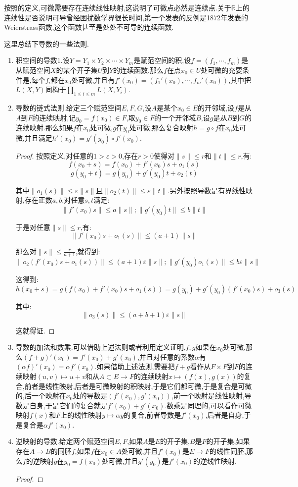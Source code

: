 按照的定义,可微需要存在连续线性映射,这说明了可微点必然是连续点.关于$\mathbb{R}$上的连续性是否说明可导曾经困扰数学界很长时间,第一个发表的反例是1872年发表的Weierstrass函数,这个函数甚至是处处不可导的连续函数.

这里总结下导数的一些法则.
\begin{enumerate}
	\item 积空间的导数1.设$Y=Y_1\times Y_2\times\cdots\times Y_m$是赋范空间的积,设$f=(f_1,\cdots,f_m)$是从赋范空间$X$的某个开子集$U$到$Y$的连续函数.那么$f$在点$x_0\in U$处可微的充要条件是,每个$f_i$都在$x_0$处可微,并且有$f'(x_0)=(f_1'(x_0),\cdots,f_m'(x_0))$,其中把$L(X,Y)$同构于$\prod_{1\le i\le m}L(X,Y_i)$.
	\item 导数的链式法则.给定三个赋范空间$E,F,G$,设$A$是某个$x_0\in E$的开邻域,设$f$是从$A$到$F$的连续映射,记$y_0=f(x_0)\in F$,取$y_0\in F$的一个开邻域$B$,设$g$是从$B$到$G$的连续映射.那么如果$f$在$x_0$处可微,$g$在$y_0$处可微,那么复合映射$h=g\circ f$在$x_0$处可微,并且满足$h'(x_0)=g'(y_0)\circ f'(x_0)$.
	\begin{proof}
		
		按照定义,对任意的$1>\varepsilon>0$,存在$r>0$使得对$\|s\|\le r$和$\|t\|\le r$,有:
		$$f(x_0+s)=f(x_0)+f'(x_0)s+o_1(s)$$
		$$g(y_0+t)=g(y_0)+g'(y_0)t+o_2(t)$$
		
		其中$\|o_1(s)\|\le\varepsilon\|s\|$且$\|o_2(t)\|\le\varepsilon\|t\|$.另外按照导数是有界线性映射,存在正数$a,b$,对任意$s,t$满足:
		$$\|f'(x_0)s\|\le a\|s\|;\|g'(y_0)t\|\le b\|t\|$$
		
		于是对任意$\|s\|\le r$,有:
		$$\|f'(x_0)s+o_1(s)\|\le(a+1)\|s\|$$
		
		那么对$\|s\|\le\frac{r}{a+1}$,就得到:
		$$\|o_2(f'(x_0)s+o_1(s))\|\le(a+1)\varepsilon\|s\|;\|g'(y_0)o_1(s)\|\le b\varepsilon\|s\|$$
		
		这得到:
		$$h(x_0+s)=g(f(x_0)+f'(x_0)s+o_1(s))=g(y_0)+g'(y_0)(f'(x_0)s)+o_3(s)$$
		
		其中:
		$$\|o_3(s)\|\le(a+b+1)\varepsilon\|s\|$$
		
		这就得证.
		
	\end{proof}
	\item 导数的加法和数乘.可以借助上述法则或者利用定义证明,$f,g$如果在$x_0$处可微,那么$(f+g)'(x_0)=f'(x_0)+g'(x_0)$,并且对任意的系数$\alpha$有$(\alpha f)'(x_0)=\alpha f'(x_0)$.如果借助上述法则,需要把$f+g$看作从$F\times F$到$F$的连续映射$(u,v)\mapsto u+v$和从$A\subset E\to F$的连续映射$x\mapsto(f(x),g(x))$的复合,前者是线性映射,后者是可微映射的积映射,于是它们都可微,于是复合是可微的,后一个映射在$x_0$处的导数是$(f'(x_0),g'(x_0))$,前一个映射是线性映射,导数是自身,于是它们的复合就是$f'(x_0)+g'(x_0)$.数乘是同理的,可以看作可微映射$f(x)$和$F$上的线性映射$y\mapsto\alpha y$的复合,前者导数是$f'(x_0)$,后者是自身,于是复合是$\alpha f'(x_0)$.
	\item 逆映射的导数.给定两个赋范空间$E,F$,如果$A$是$E$的开子集,$B$是$F$的开子集,如果存在$A\to B$的同胚$f$,如果$f$在$x_0\in A$处可微,并且$f'(x_0)$是$E\to F$的线性同胚,那么$f$的逆映射$g$在$y_0=f(x_0)$处可微,并且$g'(y_0)$是$f'(x_0)$的逆线性映射.
	\begin{proof}
		

\end{proof}
\end{enumerate}
